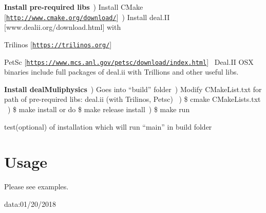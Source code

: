 \begin{DoxyEnumerate}
\item {\bfseries Install pre-\/required libs}~) Install C\+Make \mbox{[}\href{http://www.cmake.org/download/}{\tt http\+://www.\+cmake.\+org/download/}\mbox{]}~) Install deal.\+II \mbox{[}www.\+dealii.\+org/download.html\mbox{]} with~\newline

\begin{DoxyItemize}
\item Trilinos \mbox{[}\href{https://trilinos.org/}{\tt https\+://trilinos.\+org/}\mbox{]}~\newline

\item Pet\+Sc \mbox{[}\href{https://www.mcs.anl.gov/petsc/download/index.html}{\tt https\+://www.\+mcs.\+anl.\+gov/petsc/download/index.\+html}\mbox{]}~\newline
 Deal.\+II O\+SX binaries include full packages of deal.\+ii with Trillions and other useful libs.
\end{DoxyItemize}
\item {\bfseries Install deal\+Muliphysics}~) Goes into “build” folder~) Modify C\+Make\+List.\+txt for path of pre-\/required libs\+: deal.\+ii (with Trilinos, Petsc) ~) \$ cmake C\+Make\+Lists.\+txt ~) \$ make install or do \$ make release install~) \$ make run ~\newline

\begin{DoxyItemize}
\item test(optional) of installation which will run “main” in build folder ~\newline

\end{DoxyItemize}
\end{DoxyEnumerate}

\section*{{\bfseries Usage}~\newline
 }

Please see examples.

data\+:01/20/2018 